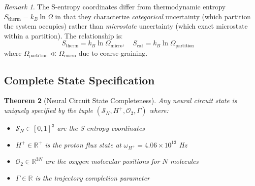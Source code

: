 \documentclass[aps,prd,twocolumn,superscriptaddress,floatfix,nofootinbib]{revtex4-2}
\newtheorem{theorem}{Theorem}[section]
\theoremstyle{remark}
\newtheorem{remark}[theorem]{Remark}
\begin{document}
\begin{remark}
The S-entropy coordinates differ from thermodynamic entropy $S_{\text{therm}} = k_B \ln \Omega$ in that they characterize \emph{categorical} uncertainty (which partition the system occupies) rather than \emph{microstate} uncertainty (which exact microstate within a partition). The relationship is:
$$
S_{\text{therm}} = k_B \ln \Omega_{\text{micro}}, \quad S_{\text{cat}} = k_B \ln \Omega_{\text{partition}}
$$
where $\Omega_{\text{partition}} \ll \Omega_{\text{micro}}$ due to coarse-graining.
\end{remark}

\subsection{Complete State Specification}

\begin{theorem}[Neural Circuit State Completeness]
\label{thm:neural_complete}
Any neural circuit state is uniquely specified by the tuple $(\mathcal{S}_N, H^+, \mathcal{O}_2, \Gamma)$ where:
\begin{itemize}
\item $\mathcal{S}_N \in [0,1]^3$ are the S-entropy coordinates
\item $H^+ \in \mathbb{R}^+$ is the proton flux state at $\omega_{H^+} = 4.06 \times 10^{13}$ Hz
\item $\mathcal{O}_2 \in \mathbb{R}^{3N}$ are the oxygen molecular positions for $N$ molecules
\item $\Gamma \in \mathbb{R}$ is the trajectory completion parameter
\end{itemize}
\end{theorem}
\end{document}
